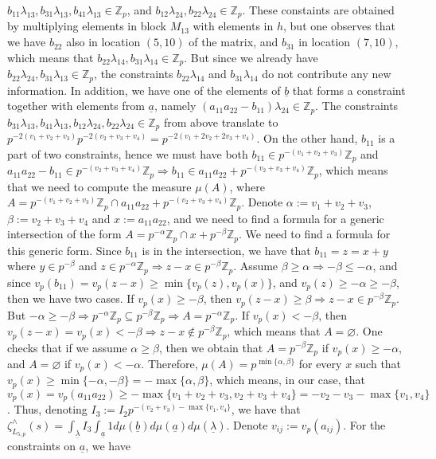 \documentclass{article}
\begin{document}
$b_{11}\lambda_{13},b_{31}\lambda_{13},b_{41}\lambda_{13}\in\mathbb{Z}_{p}$, and $b_{12}\lambda_{24},b_{22}\lambda_{24}\in\mathbb{Z}_{p}$. These constaints are obtained by multiplying elements in block $M_{13}$ with elements in $h$, but one observes that we have $b_{22}$ also in location $(5,10)$ of the matrix, and $b_{31}$ in location $(7,10)$, which means that $b_{22}\lambda_{14},b_{31}\lambda_{14}\in\mathbb{Z}_{p}$. But since we already have $b_{22}\lambda_{24},b_{31}\lambda_{13}\in\mathbb{Z}_{p}$, the constraints $b_{22}\lambda_{14}$ and $b_{31}\lambda_{14}$ do not contribute any new information. In addition, we have one of the elements of $\underline{b}$ that forms a constraint together with elements from $\underline{a}$, namely $(a_{11}a_{22}-b_{11})\lambda_{24}\in\mathbb{Z}_{p}$. The constraints $b_{31}\lambda_{13},b_{41}\lambda_{13},b_{12}\lambda_{24},b_{22}\lambda_{24}\in\mathbb{Z}_{p}$ from above translate to $p^{-2(v_{1}+v_{2}+v_{3})}p^{-2(v_{2}+v_{3}+v_{4})}=p^{-2(v_{1}+2v_{2}+2v_{3}+v_{4})}$. On the other hand, $b_{11}$ is a part of two constraints, hence we must have both $b_{11}\in{p^{-(v_{1}+v_{2}+v_{3})}\mathbb{Z}_{p}}$ and $a_{11}a_{22}-b_{11}\in{p^{-(v_{2}+v_{3}+v_{4})}\mathbb{Z}_{p}}\Rightarrow{b_{11}\in{a_{11}a_{22}+p^{-(v_{2}+v_{3}+v_{4})}\mathbb{Z}_{p}}}$, which means that we need to compute the measure $\mu(A)$, where $A=p^{-(v_{1}+v_{2}+v_{3})}\mathbb{Z}_{p}\cap{a_{11}a_{22}+p^{-(v_{2}+v_{3}+v_{4})}\mathbb{Z}_{p}}$. Denote $\alpha:=v_{1}+v_{2}+v_{3}$, $\beta:=v_{2}+v_{3}+v_{4}$ and $x:=a_{11}a_{22}$, and we need to find a formula for a generic intersection of the form $A={p^{-\alpha}\mathbb{Z}_{p}\cap{x+p^{-\beta}}\mathbb{Z}_{p}}$. We need to find a formula for this generic form. Since $b_{11}$ is in the intersection, we have that $b_{11}=z=x+y$ where $y\in{p^{-\beta}}$ and $z\in{p^{-\alpha}\mathbb{Z}_{p}}\Rightarrow{z-x\in{p^{-\beta}\mathbb{Z}_{p}}}$. Assume $\beta\geq\alpha\Rightarrow{-\beta\leq-\alpha}$, and since $v_{p}(b_{11})=v_{p}(z-x)\geq{\min\{v_{p}(z),v_{p}(x)\}}$, and $v_{p}(z)\geq{-\alpha}\geq{-\beta}$, then we have two cases. If $v_{p}(x)\geq{-\beta}$, then $v_{p}(z-x)\geq{\beta}\Rightarrow{z-x\in{p^{-\beta}\mathbb{Z}_{p}}}$. But $-\alpha\geq{-\beta}\Rightarrow{p^{-\alpha}\mathbb{Z}_{p}\subseteq{p^{-\beta}\mathbb{Z}_{p}}}\Rightarrow{A=p^{-\alpha}\mathbb{Z}_{p}}$. If $v_{p}(x)<{-\beta}$, then $v_{p}(z-x)=v_{p}(x)<-\beta\Rightarrow{z-x}\notin{p^{-\beta}\mathbb{Z}_{p}}$, which means that $A=\varnothing$. One checks that if we assume $\alpha\geq\beta$, then we obtain that $A=p^{-\beta}\mathbb{Z}_{p}$ if $v_{p}(x)\geq{-\alpha}$, and $A=\varnothing$ if $v_{p}(x)<-\alpha$. Therefore, $\mu(A)=p^{\min\{\alpha,\beta\}}$ for every $x$ such that $v_{p}(x)\geq\min\{-\alpha,-\beta\}=-\max\{\alpha,\beta\}$, which means, in our case, that $v_{p}(x)=v_{p}(a_{11}a_{22})\geq-\max\{v_{1}+v_{2}+v_{3},v_{2}+v_{3}+v_{4}\}=-v_{2}-v_{3}-\max\{v_{1},v_{4}\}$. Thus, denoting $I_{3}:=I_{2}p^{-(v_{2}+v_{3})-\max\{v_{1},v_{4}\}}$, we have that $\zeta_{L_{5,p}}^{\wedge}(s)=\displaystyle\int_{\underline\lambda}I_{3}\int_{\underline{a}}1d\mu(\underline{b})d\mu(\underline{a})d\mu(\underline{\lambda})$. Denote $v_{ij}:=v_{p}(a_{ij})$. For the constraints on $\underline{a}$, we have
\end{document}
